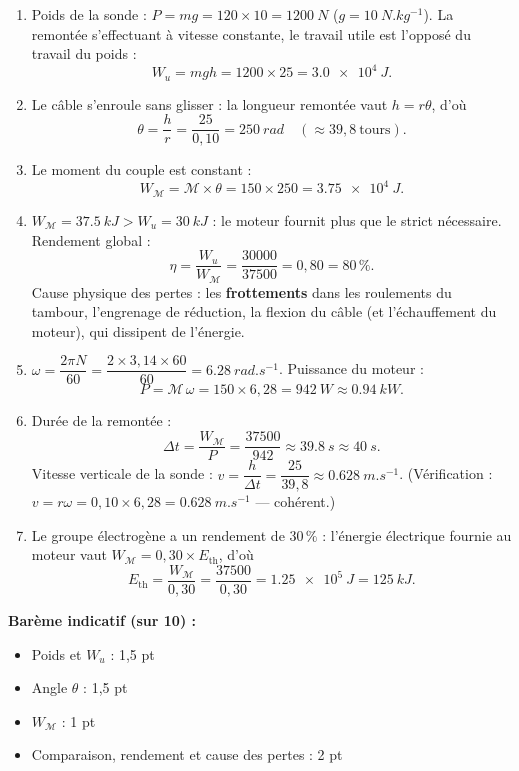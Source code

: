 \documentclass[11pt]{article}
\begin{document}
\begin{corrige}
\begin{enumerate}
\item Poids de la sonde : $P = mg = 120\times 10 = \SI{1200}{N}$ ($g = \SI{10}{N.kg^{-1}}$). La remontée s'effectuant à vitesse constante, le travail utile est l'opposé du travail du poids :
\[ W_u = mgh = 1200\times 25 = \SI{3,0e4}{J}. \]
\item Le câble s'enroule sans glisser : la longueur remontée vaut $h = r\theta$, d'où
\[ \theta = \dfrac{h}{r} = \dfrac{25}{0,10} = \SI{250}{rad} \quad (\approx 39,8~\text{tours}). \]
\item Le moment du couple est constant :
\[ W_{\mathcal{M}} = \mathcal{M}\times\theta = 150\times 250 = \SI{3,75e4}{J}. \]
\item $W_{\mathcal{M}} = \SI{37,5}{kJ} > W_u = \SI{30}{kJ}$ : le moteur fournit plus que le strict nécessaire. Rendement global :
\[ \eta = \dfrac{W_u}{W_{\mathcal{M}}} = \dfrac{\num{30000}}{\num{37500}} = 0,80 = 80\,\%. \]
Cause physique des pertes : les \textbf{frottements} dans les roulements du tambour, l'engrenage de réduction, la flexion du câble (et l'échauffement du moteur), qui dissipent de l'énergie.
\item $\omega = \dfrac{2\pi N}{60} = \dfrac{2\times 3,14\times 60}{60} = \SI{6,28}{rad.s^{-1}}$. Puissance du moteur :
\[ P = \mathcal{M}\,\omega = 150\times 6,28 = \SI{942}{W} \approx \SI{0,94}{kW}. \]
\item Durée de la remontée :
\[ \Delta t = \dfrac{W_{\mathcal{M}}}{P} = \dfrac{\num{37500}}{942} \approx \SI{39,8}{s} \approx \SI{40}{s}. \]
Vitesse verticale de la sonde : $v = \dfrac{h}{\Delta t} = \dfrac{25}{39,8} \approx \SI{0,628}{m.s^{-1}}$. (Vérification : $v = r\omega = 0,10\times 6,28 = \SI{0,628}{m.s^{-1}}$ — cohérent.)
\item Le groupe électrogène a un rendement de $30\,\%$ : l'énergie électrique fournie au moteur vaut $W_{\mathcal{M}} = 0,30\times E_{\text{th}}$, d'où
\[ E_{\text{th}} = \dfrac{W_{\mathcal{M}}}{0,30} = \dfrac{\num{37500}}{0,30} = \SI{1,25e5}{J} = \SI{125}{kJ}. \]
\end{enumerate}
\textbf{Barème indicatif (sur 10) :}
\begin{itemize}
\item Poids et $W_u$ : 1,5 pt
\item Angle $\theta$ : 1,5 pt
\item $W_{\mathcal{M}}$ : 1 pt
\item Comparaison, rendement et cause des pertes : 2 pt

\end{itemize}
\end{corrige}
\end{document}
